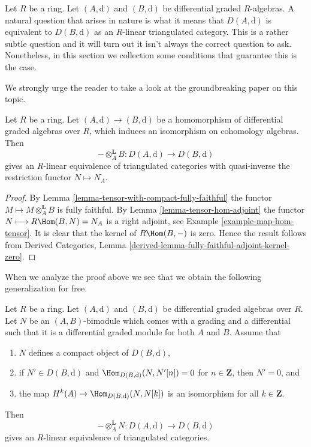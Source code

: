 \noindent
Let $R$ be a ring. Let $(A, \text{d})$ and $(B, \text{d})$ be differential
graded $R$-algebras. A natural question that arises in nature is what
it means that $D(A, \text{d})$ is equivalent to $D(B, \text{d})$
as an $R$-linear triangulated category. This is a rather subtle question
and it will turn out it isn't always the correct question to ask.
Nonetheless, in this section we collection some conditions
that guarantee this is the case.

\medskip\noindent
We strongly urge the reader to take a look at the groundbreaking
paper \cite{Rickard} on this topic.

\begin{lemma}
\label{lemma-qis-equivalence}
Let $R$ be a ring. Let $(A, \text{d}) \to (B, \text{d})$ be a
homomorphism of differential graded algebras over $R$, which induces
an isomorphism on cohomology algebras. Then
$$
- \otimes_A^\mathbf{L} B : D(A, \text{d}) \to D(B, \text{d})
$$
gives an $R$-linear equivalence of triangulated categories with
quasi-inverse the restriction functor $N \mapsto N_A$.
\end{lemma}

\begin{proof}
By Lemma \ref{lemma-tensor-with-compact-fully-faithful}
the functor $M \longmapsto M \otimes_A^\mathbf{L} B$ is
fully faithful. By Lemma \ref{lemma-tensor-hom-adjoint}
the functor $N \longmapsto R\Hom(B, N) = N_A$ is a right adjoint, see
Example \ref{example-map-hom-tensor}.
It is clear that the kernel of $R\Hom(B, -)$ is zero.
Hence the result follows from
Derived Categories, Lemma
\ref{derived-lemma-fully-faithful-adjoint-kernel-zero}.
\end{proof}

\noindent
When we analyze the proof above we see that we obtain the
following generalization for free.

\begin{lemma}
\label{lemma-tilting-equivalence}
Let $R$ be a ring. Let $(A, \text{d})$ and $(B, \text{d})$ be 
differential graded algebras over $R$. Let $N$ be an $(A, B)$-bimodule
which comes with a grading and a differential such that it is a
differential graded module for both $A$ and $B$. Assume that
\begin{enumerate}
\item $N$ defines a compact object of $D(B, \text{d})$,
\item if $N' \in D(B, \text{d})$ and
$\Hom_{D(B, \text{d})}(N, N'[n]) = 0$ for $n \in \mathbf{Z}$,
then $N' = 0$, and
\item the map $H^k(A) \to \Hom_{D(B, \text{d})}(N, N[k])$ is an
isomorphism for all $k \in \mathbf{Z}$.
\end{enumerate}
Then
$$
- \otimes_A^\mathbf{L} N : D(A, \text{d}) \to D(B, \text{d})
$$
gives an $R$-linear equivalence of triangulated categories.
\end{lemma}

